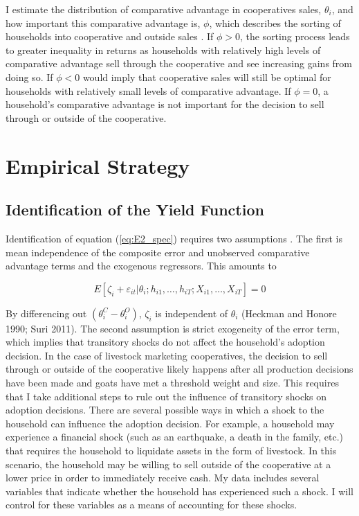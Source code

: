 \documentclass[11pt]{article}
\begin{document}
I estimate the distribution of comparative advantage in cooperatives sales, $\theta_i$, and how important this comparative advantage is, $\phi$, which describes the sorting of households into cooperative and outside sales \citep{michler-et.al.18,suri11}. If $\phi > 0$, the sorting process leads to greater inequality in returns as households with relatively high levels of comparative advantage sell through the cooperative and see increasing gains from doing so. If $\phi < 0$ would imply that cooperative sales will still be optimal for households with relatively small levels of comparative advantage. If $\phi = 0$, a household’s comparative advantage is not important for the decision to sell through or outside of the cooperative.

\section{Empirical Strategy} \label{sec:E2_emp}

\subsection{Identification of the Yield Function}

Identification of equation (\ref{eq:E2_spec}) requires two assumptions \citep{michler-et.al.18,suri11}. The first is mean independence of the composite error and unobserved comparative advantage terms and the exogenous regressors. This amounts to

\begin{equation} \label{eq:E2_assumption1}
    E[\zeta_i + \varepsilon_{it} | \theta_{i}; h_{i1}, \dots, h_{iT}; X_{i1}, \dots, X_{iT}] = 0
\end{equation}

By differencing out $(\theta^{C}_{i} - \theta^{O}_{i})$, $\zeta_i$ is independent of $\theta_i$ (Heckman and Honore 1990; Suri 2011). The second assumption is strict exogeneity of the error term, which implies that transitory shocks do not affect the household’s adoption decision. In the case of livestock marketing cooperatives, the decision to sell through or outside of the cooperative likely happens after all production decisions have been made and goats have met a threshold weight and size. This requires that I take additional steps to rule out the influence of transitory shocks on adoption decisions. There are several possible ways in which a shock to the household can influence the adoption decision. For example, a household may experience a financial shock (such as an earthquake, a death in the family, etc.) that requires the household to liquidate assets in the form of livestock. In this scenario, the household may be willing to sell outside of the cooperative at a lower price in order to immediately receive cash. My data includes several variables that indicate whether the household has experienced such a shock. I will control for these variables as a means of accounting for these shocks.
\end{document}
